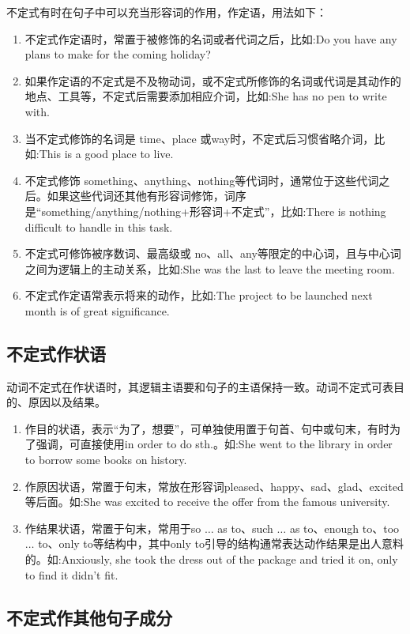 不定式有时在句子中可以充当形容词的作用，作定语，用法如下：
\begin{enumerate}
  \item 不定式作定语时，常置于被修饰的名词或者代词之后，比如:Do you have any plans to make for the coming holiday?
  \item 如果作定语的不定式是不及物动词，或不定式所修饰的名词或代词是其动作的地点、工具等，不定式后需要添加相应介词，比如:She has no pen to write with.
  \item 当不定式修饰的名词是 time、place 或way时，不定式后习惯省略介词，比如:This is a good place to live.
  \item 不定式修饰 something、anything、nothing等代词时，通常位于这些代词之后。如果这些代词还其他有形容词修饰，词序是“something/anything/nothing+形容词+不定式”，比如:There is nothing difficult to handle in this task.
  \item 不定式可修饰被序数词、最高级或 no、all、any等限定的中心词，且与中心词之间为逻辑上的主动关系，比如:She was the last to leave the meeting room.
  \item 不定式作定语常表示将来的动作，比如:The project to be launched next month is of great significance.
\end{enumerate}

\subsection{不定式作状语}

动词不定式在作状语时，其逻辑主语要和句子的主语保持一致。动词不定式可表目的、原因以及结果。
\begin{enumerate}
  \item 作目的状语，表示“为了，想要”，可单独使用置于句首、句中或句末，有时为了强调，可直接使用in order to do sth.。如:She went to the library in order to borrow some books on history.
  \item 作原因状语，常置于句末，常放在形容词pleased、happy、sad、glad、excited 等后面。如:She was excited to receive the offer from the famous university.
  \item 作结果状语，常置于句末，常用于so \(\ldots\) as to、such \(\ldots\) as to、enough to、too \(\ldots\) to、only to等结构中，其中only to引导的结构通常表达动作结果是出人意料的。如:Anxiously, she took the dress out of the package and tried it on, only to find it didn't fit.
\end{enumerate}

\subsection{不定式作其他句子成分}

